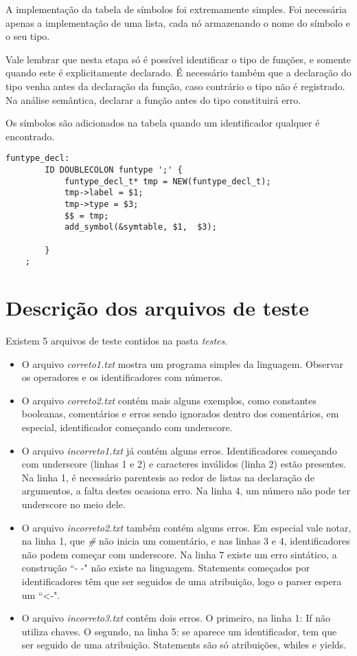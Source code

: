 \documentclass[11pt]{article}
\begin{document}
A implementação da tabela de símbolos foi extremamente simples. Foi necessária apenas a implementação de uma
lista, cada nó armazenando o nome do símbolo e o seu tipo. 

Vale lembrar que nesta etapa só é possível identificar o tipo de funções, e somente quando este é explicitamente declarado.
É necessário também que a declaração do tipo venha antes da declaração da função, caso contrário o tipo não é registrado.
Na análise semântica, declarar a função antes do tipo constituirá erro.

Os símbolos são adicionados na tabela quando um identificador qualquer é encontrado.

\begin{lstlisting}[basicstyle=\small]
    funtype_decl:
        ID DOUBLECOLON funtype ';' {
            funtype_decl_t* tmp = NEW(funtype_decl_t);
            tmp->label = $1;
            tmp->type = $3;
            $$ = tmp;
            add_symbol(&symtable, $1,  $3);

        }
	;
\end{lstlisting}


\section{Descrição dos arquivos de teste}

Existem 5 arquivos de teste contidos na pasta \emph{testes}.
\begin{itemize}
    \item O arquivo \emph{correto1.txt} mostra um programa simples da linguagem. Observar os operadores e os identificadores com números.
    \item O arquivo \emph{correto2.txt} contém mais alguns exemplos, como constantes booleanas, comentários e erros sendo ignorados dentro dos comentários, 
        em especial, identificador começando com underscore.
    \item O arquivo \emph{incorreto1.txt} já contém alguns erros. Identificadores começando com underscore (linhas 1 e 2) e caracteres inválidos (linha 2) estão presentes. Na linha 1, é necessário parentesis ao redor de listas na declaração de argumentos, a falta destes ocasiona erro. Na linha 4, um número não pode ter underscore no meio dele.
    \item O arquivo \emph{incorreto2.txt} também contém alguns erros. Em especial vale notar, na linha 1, que \emph{\#} não inicia um comentário, e nas linhas 3 e 4, identificadores não podem começar com underscore. Na linha 7 existe um erro sintático, a construção ``- -" não existe na linguagem. Statements começados por identificadores têm que ser seguidos de uma atribuição, logo o parser espera um ``\textless-".  
    \item O arquivo \emph{incorreto3.txt} contém dois erros. O primeiro, na linha 1: If não utiliza chaves. O segundo, na linha 5: se aparece um identificador, tem que ser seguido de uma atribuição. Statements são só atribuições, whiles e yields.
\end{itemize}
\end{document}
